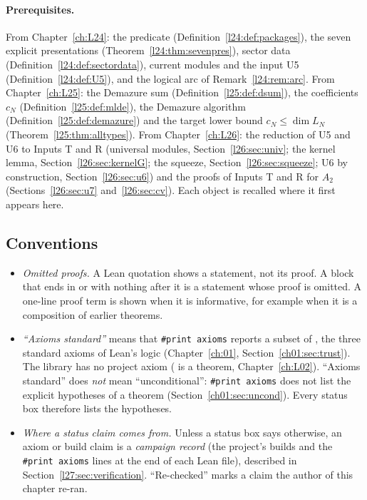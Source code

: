 \paragraph{Prerequisites.} From Chapter~\ref{ch:L24}: the predicate 
(Definition~\ref{l24:def:packages}), the seven explicit presentations (Theorem~\ref{l24:thm:sevenpres}), sector data
(Definition~\ref{l24:def:sectordata}), current modules and the input U5 (Definition~\ref{l24:def:U5}), and the logical
arc of Remark~\ref{l24:rem:arc}. From Chapter~\ref{ch:L25}: the Demazure sum (Definition~\ref{l25:def:dsum}), the
coefficients $c_N$ (Definition~\ref{l25:def:mlde}), the Demazure algorithm (Definition~\ref{l25:def:demazure}) and the
target lower bound $c_N\le\dim L_N$ (Theorem~\ref{l25:thm:alltypes}). From Chapter~\ref{ch:L26}: the reduction of U5
and U6 to Inputs T and R (universal modules, Section~\ref{l26:sec:univ}; the kernel lemma, Section~\ref{l26:sec:kernelG};
the squeeze, Section~\ref{l26:sec:squeeze}; U6 by construction, Section~\ref{l26:sec:u6}) and the proofs of Inputs T and
R for $A_2$ (Sections~\ref{l26:sec:u7} and~\ref{l26:sec:cv}). Each object is recalled where it first appears here.

\subsection{Conventions}

\begin{itemize}
\item \emph{Omitted proofs.} A Lean quotation shows a statement, not its proof. A block that ends in \lean{:=} or
   with nothing after it is a statement whose proof is omitted. A one-line proof term is shown when it is
  informative, for example when it is a composition of earlier theorems.
\item \emph{``Axioms standard''} means that \texttt{\#print axioms} reports a subset of
  , the three standard axioms of Lean's logic (Chapter~\ref{ch:01},
  Section~\ref{ch01:sec:trust}). The library has no project axiom ( is a theorem, Chapter~\ref{ch:L02}).
  ``Axioms standard'' does \emph{not} mean ``unconditional'': \texttt{\#print axioms} does not list the explicit
  hypotheses of a theorem (Section~\ref{ch01:sec:uncond}). Every status box therefore lists the hypotheses.
\item \emph{Where a status claim comes from.} Unless a status box says otherwise, an axiom or build claim is a
  \emph{campaign record} (the project's builds and the \texttt{\#print axioms} lines at the end of each Lean file),
  described in Section~\ref{l27:sec:verification}. ``Re-checked'' marks a claim the author of this chapter re-ran.
\end{itemize}


